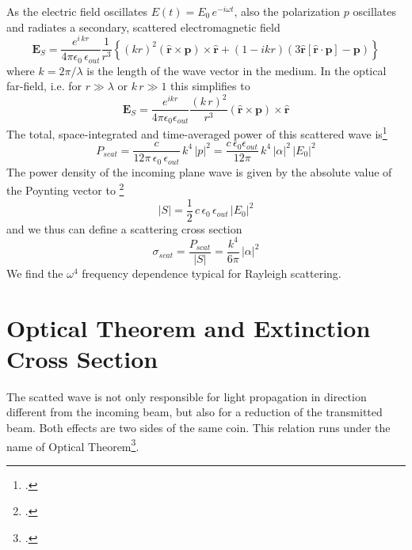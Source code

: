 As the electric field oscillates $E(t) = E_0 \, e^{-i \omega t}$, also the polarization $p$ oscillates and radiates a secondary, scattered electromagnetic field 
\[
  \mathbf{E}_S = \frac{ e^{i \, k  r} }{4\pi\epsilon_0 \, \epsilon_{out}}  \frac{1}{r^3}\left\{
      (k r )^2 \left( \hat{\mathbf{r}} \times \mathbf{p} \right) \times \hat{\mathbf{r}} +
      \left( 1 -  i k r \right)
        \left( 3\hat{\mathbf{r}} \left[\hat{\mathbf{r}} \cdot \mathbf{p}\right] - \mathbf{p} \right)
    \right\}
\]
where $k = 2 \pi / \lambda$ is the length of the wave vector in the medium. In the optical far-field, i.e. for $r \gg \lambda$ or $k \, r \gg 1$ this simplifies to 
\[
  \mathbf{E}_S = \frac{e^{ikr}}{4\pi\epsilon_0 \epsilon_{out} } 
      \frac{( k \, r)^2}{ r^3} \left( \hat{\mathbf{r}} \times \mathbf{p} \right) \times \hat{\mathbf{r}} 
\]
The total, space-integrated and time-averaged power of this scattered wave is\footcite[chapter 4.5.2]{Nolting-ED}
\[
P_{scat} =\frac{c  }{12 \pi  \, \epsilon_0 \, \epsilon_{out} } \, k^4 \, |p|^2 =
\frac{c \, \epsilon_0 \epsilon_{out} }{12 \pi  } \, k^4 \, |\alpha|^2 \, |E_0|^2
\]
The power density of the incoming plane wave is given by the absolute value of the Poynting vector to \footcite[chapter 4.3.8]{Nolting-ED}
\[
 |S| = \frac{1}{2} \, c \, \epsilon_0 \, \epsilon_{out} \, |E_0|^2
\]
and we thus can define a scattering cross section
\[
\sigma_{scat} = \frac{P_{scat}}{|S|} = \frac{k^4}{6 \pi }  \, |\alpha|^2 
\]
We find the $\omega^4$ frequency dependence typical for Rayleigh scattering.



\section{Optical Theorem and Extinction Cross Section}

The scatted wave is not only responsible for light propagation in direction different from the incoming beam, but also for a reduction of the transmitted beam. Both effects are two sides of the same coin. This relation runs under the name of Optical Theorem\footcite{Newton:1976cz}.

